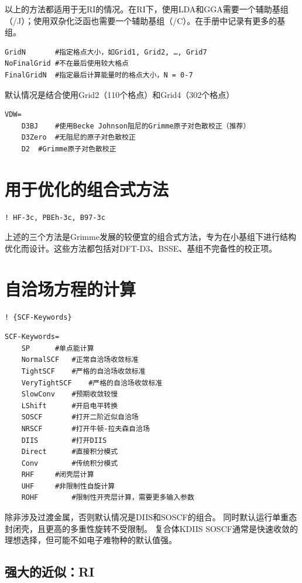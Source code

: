 \documentclass{ctexart}
\begin{document}
	以上的方法都适用于无RI的情况。在RI下，使用LDA和GGA需要一个辅助基组（/J）；使用双杂化泛函也需要一个辅助基组（/C）。在手册中记录有更多的基组。
	\begin{lstlisting}
GridN		#指定格点大小，如Grid1, Grid2, …, Grid7
NoFinalGrid	#不在最后使用较大格点
FinalGridN	#指定最后计算能量时的格点大小，N = 0-7
	\end{lstlisting}
	
	默认情况是结合使用Grid2（110个格点）和Grid4（302个格点）
	
	\begin{lstlisting}
VDW=
	D3BJ 	#使用Becke Johnson阻尼的Grimme原子对色散校正（推荐）
	D3Zero 	#无阻尼的原子对色散校正
	D2 	#Grimme原子对色散校正
	\end{lstlisting}
	
	\section{用于优化的组合式方法}
	\begin{lstlisting}
! HF-3c, PBEh-3c, B97-3c
	\end{lstlisting}
	
	上述的三个方法是Grimme发展的较便宜的组合式方法，专为在小基组下进行结构优化而设计。这些方法都包括对DFT-D3、BSSE、基组不完备性的校正项。
	
	\section{自洽场方程的计算}
	\begin{lstlisting}
! {SCF-Keywords}
	\end{lstlisting}
	
	\begin{lstlisting}
SCF-Keywords= 
	SP		#单点能计算
	NormalSCF	#正常自洽场收敛标准
	TightSCF	#严格的自洽场收敛标准
	VeryTightSCF	#严格的自洽场收敛标准
	SlowConv	#预期收敛较慢
	LShift		#开启电平转换
	SOSCF		#打开二阶近似自洽场
	NRSCF		#打开牛顿-拉夫森自洽场
	DIIS		#打开DIIS
	Direct		#直接积分模式
	Conv		#传统积分模式
	RHF		#闭壳层计算
	UHF		#非限制性自旋计算
	ROHF		#限制性开壳层计算，需要更多输入参数
	\end{lstlisting}
	
	除非涉及过渡金属，否则默认情况是DIIS和SOSCF的组合。
	同时默认运行单重态封闭壳，且更高的多重性旋转不受限制。
	复合体KDIIS SOSCF通常是快速收敛的理想选择，但可能不如电子难物种的默认值强。
	
	\subsection{强大的近似：RI} 
	
\end{document}
